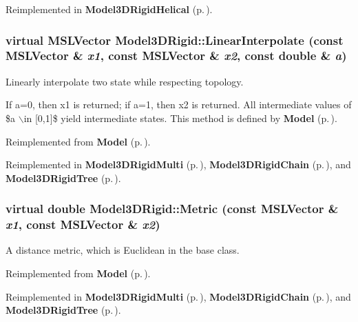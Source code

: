 Reimplemented in {\bf Model3DRigid\-Helical} {\rm (p.\,\pageref{class_Model3DRigidHelical_a3})}.
\subsubsection{\setlength{\rightskip}{0pt plus 5cm}virtual {\bf MSLVector} Model3DRigid::Linear\-Interpolate (const {\bf MSLVector} \& {\em x1}, const {\bf MSLVector} \& {\em x2}, const double \& {\em a})\hspace{0.3cm}{\tt  [virtual]}}\label{class_Model3DRigid_a5}


Linearly interpolate two state while respecting topology.

If a=0, then x1 is returned; if a=1, then x2 is returned. All intermediate values of \$a $\backslash$in [0,1]\$ yield intermediate states. This method is defined by {\bf Model} {\rm (p.\,\pageref{class_Model})}. 

Reimplemented from {\bf Model} {\rm (p.\,\pageref{class_Model_a6})}.

Reimplemented in {\bf Model3DRigid\-Multi} {\rm (p.\,\pageref{class_Model3DRigidMulti_a3})}, {\bf Model3DRigid\-Chain} {\rm (p.\,\pageref{class_Model3DRigidChain_a4})}, and {\bf Model3DRigid\-Tree} {\rm (p.\,\pageref{class_Model3DRigidTree_a4})}.
\subsubsection{\setlength{\rightskip}{0pt plus 5cm}virtual double Model3DRigid::Metric (const {\bf MSLVector} \& {\em x1}, const {\bf MSLVector} \& {\em x2})\hspace{0.3cm}{\tt  [virtual]}}\label{class_Model3DRigid_a4}


A distance metric, which is Euclidean in the base class.



Reimplemented from {\bf Model} {\rm (p.\,\pageref{class_Model_a9})}.

Reimplemented in {\bf Model3DRigid\-Multi} {\rm (p.\,\pageref{class_Model3DRigidMulti_a2})}, {\bf Model3DRigid\-Chain} {\rm (p.\,\pageref{class_Model3DRigidChain_a5})}, and {\bf Model3DRigid\-Tree} {\rm (p.\,\pageref{class_Model3DRigidTree_a5})}.

